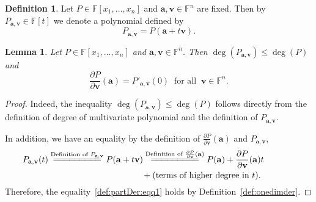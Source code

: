 \documentclass{elsarticle}
\def\F{{\mathbb F}}
\newtheorem{lemma}[theorem]{Lemma}
\theoremstyle{definition}
\newtheorem{definition}[theorem]{Definition}
\numberwithin{equation}{section}
\begin{document}
\begin{definition}\label{def:PAV}
Let $P \in \F[x_1,\ldots, x_n]$ and $\mathbf a, \mathbf v \in \F^n$ are fixed. Then by $P_{\mathbf a, \mathbf v} \in \F[t]$ we denote a polynomial defined by
\begin{equation}\label{eq:def:PAV}
P_{\mathbf a, \mathbf v} = P(\mathbf a + t \mathbf v).
\end{equation}

\end{definition}

\begin{lemma}\label{def:partDer}Let $P \in \F[x_1,\ldots, x_n]$ and $\mathbf a, \mathbf v \in \F^n$. Then $\deg(P_{\mathbf a, \mathbf v}) \le \deg(P)$ and 
\begin{equation}\label{def:partDer:eqq1}
\frac{\partial P}{\partial \mathbf v}(\mathbf a) = P'_{\mathbf a, \mathbf v}(0)\;\;\mbox{for all}\;\; \mathbf v \in \F^n.
\end{equation}
\end{lemma}
\begin{proof}Indeed, the inequality $\deg(P_{\mathbf a, \mathbf v}) \le \deg(P)$ follows directly from the definition of degree of multivariate polynomial and the definition of $P_{\mathbf a, \mathbf v}$. 

In addition, we have an equality by the definition of $\frac{\partial P}{\partial \mathbf v}(\mathbf a)$ and $P_{\mathbf a, \mathbf v}$,
\begin{multline*}
P_{\mathbf a, \mathbf v}(t) \overset{\mbox{\scriptsize Definition of $P_{\mathbf a, \mathbf v}$}}{=\joinrel=\joinrel=\joinrel=\joinrel=\joinrel=\joinrel=\joinrel=\joinrel=} P(\mathbf a + t \mathbf v) 
\overset{\mbox{\scriptsize Definition of $\frac{\partial P}{\partial \mathbf v}(\mathbf a)$}}{=\joinrel=\joinrel=\joinrel=\joinrel=\joinrel=\joinrel=\joinrel=\joinrel=} P(\mathbf a)  + \frac{\partial P}{\partial \mathbf v}(\mathbf a)t\phantom{XXXX}\\\phantom{XXXXXXXXXXX}  + \mbox{(terms of higher degree in $t$)}.
\end{multline*}
Therefore, the equality~\eqref{def:partDer:eqq1} holds by Definition~\ref{def:onedimder}.%
\end{proof}

\end{document}
